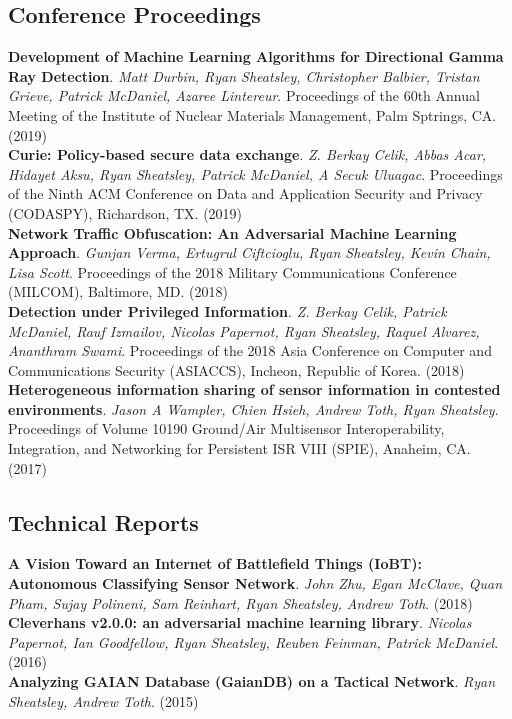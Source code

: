 \documentclass[11pt,a4paper,roman]{moderncv}        %
\begin{document}
\subsection{Conference Proceedings}
\textbf{Development of Machine Learning Algorithms for Directional Gamma Ray
Detection}. \textit{Matt Durbin, Ryan Sheatsley,  Christopher Balbier, Tristan
Grieve, Patrick McDaniel, Azaree Lintereur}. Proceedings of the 60th Annual
Meeting of the Institute of Nuclear Materials Management, Palm Sptrings, CA. (2019) \\
\textbf{Curie: Policy-based secure data exchange}. \textit{Z. Berkay Celik, Abbas Acar, Hidayet Aksu, Ryan Sheatsley, Patrick McDaniel, A Secuk Uluagac}. Proceedings of the Ninth ACM Conference on Data and Application Security and
Privacy (CODASPY), Richardson, TX. (2019) \\
\textbf{Network Traffic Obfuscation: An Adversarial Machine Learning Approach}. \textit{Gunjan Verma, Ertugrul Ciftcioglu, Ryan Sheatsley, Kevin Chain, Lisa Scott}. Proceedings of the 2018 Military Communications Conference
(MILCOM), Baltimore, MD. (2018) \\
\textbf{Detection under Privileged Information}. \textit{Z. Berkay Celik, Patrick McDaniel, Rauf Izmailov, Nicolas Papernot, Ryan Sheatsley, Raquel Alvarez, Ananthram Swami}. Proceedings of the 2018 Asia Conference on Computer
and Communications Security (ASIACCS), Incheon, Republic of Korea. (2018) \\
\textbf{Heterogeneous information sharing of sensor information in contested environments}. \textit{Jason A Wampler, Chien Hsieh, Andrew Toth, Ryan Sheatsley}. Proceedings of Volume 10190 Ground/Air Multisensor Interoperability, 
Integration, and Networking for Persistent ISR VIII (SPIE), Anaheim, CA. (2017) \\

\subsection{Technical Reports}
\textbf{A Vision Toward an Internet of Battlefield Things (IoBT): Autonomous Classifying Sensor Network}. \textit{John Zhu, Egan McClave, Quan Pham, Sujay Polineni, Sam Reinhart, Ryan Sheatsley, Andrew Toth}. (2018) \\
\textbf{Cleverhans v2.0.0: an adversarial machine learning library}. \textit{Nicolas Papernot, Ian Goodfellow, Ryan Sheatsley, Reuben Feinman, Patrick McDaniel}. (2016) \\
\textbf{Analyzing GAIAN Database (GaianDB) on a Tactical Network}. \textit{Ryan Sheatsley, Andrew Toth}. (2015) \\
\end{document}
